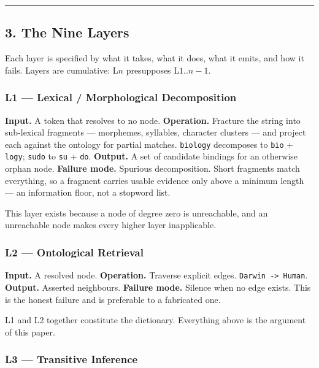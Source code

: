 \documentclass[
  11pt,
  a4paper,
]{article}
\begin{document}
\begin{center}\rule{0.5\linewidth}{0.5pt}\end{center}

\subsection{3. The Nine Layers}\label{the-nine-layers}

Each layer is specified by what it takes, what it does, what it emits,
and how it fails. Layers are cumulative: L\(n\) presupposes
L\(1..n{-}1\).

\subsubsection{L1 --- Lexical / Morphological
Decomposition}\label{l1-lexical-morphological-decomposition}

\textbf{Input.} A token that resolves to no node. \textbf{Operation.}
Fracture the string into sub-lexical fragments --- morphemes, syllables,
character clusters --- and project each against the ontology for partial
matches. \texttt{biology} decomposes to \texttt{bio} + \texttt{logy};
\texttt{sudo} to \texttt{su} + \texttt{do}. \textbf{Output.} A set of
candidate bindings for an otherwise orphan node. \textbf{Failure mode.}
Spurious decomposition. Short fragments match everything, so a fragment
carries usable evidence only above a minimum length --- an information
floor, not a stopword list.

This layer exists because a node of degree zero is unreachable, and an
unreachable node makes every higher layer inapplicable.

\subsubsection{L2 --- Ontological
Retrieval}\label{l2-ontological-retrieval}

\textbf{Input.} A resolved node. \textbf{Operation.} Traverse explicit
edges. \texttt{Darwin\ -\textgreater{}\ Human}. \textbf{Output.}
Asserted neighbours. \textbf{Failure mode.} Silence when no edge exists.
This is the honest failure and is preferable to a fabricated one.

L1 and L2 together constitute the dictionary. Everything above is the
argument of this paper.

\subsubsection{L3 --- Transitive
Inference}\label{l3-transitive-inference}
\end{document}
